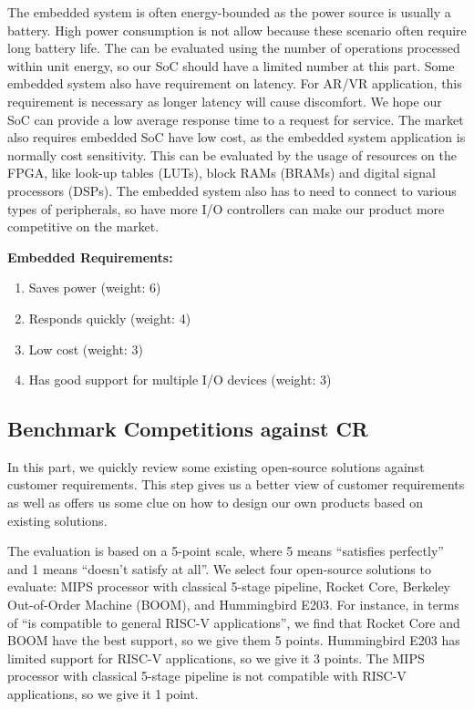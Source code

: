 The embedded system is often energy-bounded as the power source is usually a battery. High power consumption is not allow because these scenario often require long battery life. The can be evaluated using the number of operations processed within unit energy, so our SoC should have a limited number at this part. Some embedded system also have requirement on latency. For AR/VR application, this requirement is necessary as longer latency will cause discomfort. We hope our SoC can provide a low average response time to a request for service. The market also requires embedded SoC have low cost, as the embedded system application is normally cost sensitivity. This can be evaluated by the usage of resources on the FPGA, like look-up tables (LUTs), block RAMs (BRAMs) and digital signal processors (DSPs). The embedded system also has to need to connect to various types of peripherals, so have more I/O controllers can make our product more competitive on the market.

\textbf{Embedded Requirements:}
\begin{enumerate}
    \item Saves power (weight: 6)
    \item Responds quickly (weight: 4)
    \item Low cost (weight: 3)
    \item Has good support for multiple I/O devices (weight: 3)
\end{enumerate}


\subsection{Benchmark Competitions against CR}
In this part, we quickly review some existing open-source solutions against customer requirements. This step gives us a better view of customer requirements as well as offers us some clue on how to design our own products based on existing solutions.

The evaluation is based on a 5-point scale, where 5 means ``satisfies perfectly'' and 1 means ``doesn't satisfy at all''. We select four open-source solutions to evaluate: MIPS processor with classical 5-stage pipeline, Rocket Core, Berkeley Out-of-Order Machine (BOOM), and Hummingbird E203. For instance, in terms of ``is compatible to general RISC-V applications'', we find that Rocket Core and BOOM have the best support, so we give them 5 points. Hummingbird E203 has limited support for RISC-V applications, so we give it 3 points. The MIPS processor with classical 5-stage pipeline is not compatible with RISC-V applications, so we give it 1 point.

